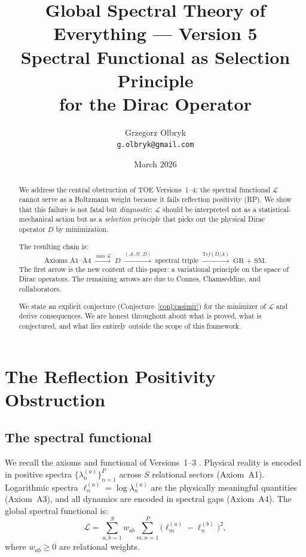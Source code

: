 \documentclass[12pt]{article}
\title{Global Spectral Theory of Everything --- Version 5\\[6pt]
\large Spectral Functional as Selection Principle\\
for the Dirac Operator}
\author{Grzegorz Olbryk\\[-2pt]
\small\texttt{g.olbryk@gmail.com}}
\date{March 2026}
\theoremstyle{definition}
\theoremstyle{remark}
\newcommand{\Tr}{\mathrm{Tr}}
\begin{document}
\maketitle

\begin{abstract}
We address the central obstruction of TOE Versions~1--4:
the spectral functional $\mathcal{L}$ cannot serve as a Boltzmann
weight because it fails reflection positivity (RP).
We show that this failure is not fatal but \emph{diagnostic}:
$\mathcal{L}$ should be interpreted not as a statistical-mechanical
action but as a \emph{selection principle} that picks out the
physical Dirac operator $D$ by minimization.

The resulting chain is:
\[
  \text{Axioms A1--A4}
  \;\xrightarrow{\min\,\mathcal{L}}
  \;D
  \;\xrightarrow{(\mathcal{A},\mathcal{H},D)}
  \;\text{spectral triple}
  \;\xrightarrow{\Tr f(D/\Lambda)}
  \;\text{GR + SM}.
\]
The first arrow is the new content of this paper: a variational
principle on the space of Dirac operators.
The remaining arrows are due to Connes, Chamseddine, and
collaborators.

We state an explicit conjecture (Conjecture~\ref{conj:casimir})
for the minimizer of $\mathcal{L}$ and derive consequences.
We are honest throughout about what is proved, what is conjectured,
and what lies entirely outside the scope of this framework.
\end{abstract}

\tableofcontents

\section{The Reflection Positivity Obstruction}
\label{sec:RP}

\subsection{The spectral functional}

We recall the axioms and functional of Versions~1--3
\cite{Olbryk2026v2,Olbryk2026v3}.  Physical reality is encoded in
positive spectra $\{\lambda_n^{(a)}\}_{n=1}^P$ across $S$ relational
sectors (Axiom~A1).  Logarithmic spectra
$\ell_n^{(a)} = \log\lambda_n^{(a)}$ are the physically meaningful
quantities (Axiom~A3), and all dynamics are encoded in spectral gaps
(Axiom~A4).  The global spectral functional is:
\begin{equation}\label{eq:L}
  \mathcal{L}
  = \sum_{a,b=1}^S w_{ab}
    \sum_{m,n=1}^P \bigl(\ell_m^{(a)} - \ell_n^{(b)}\bigr)^2,
\end{equation}
where $w_{ab} \geq 0$ are relational weights.
\end{document}
